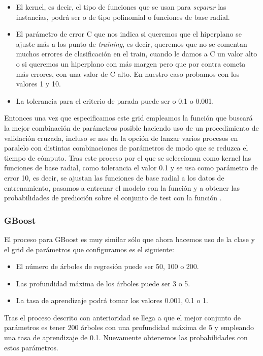 \begin{itemize}
\item El kernel, es decir, el tipo de funciones que se usan para \textit{separar} las instancias, podrá ser o de tipo polinomial o funciones de base radial.
\item El parámetro de error C que nos indica si queremos que el hiperplano se ajuste más a los punto de \textit{training}, es decir, queremos que no se comentan muchos errores de clasificación en el train, cuando le damos a C un valor alto o si queremos un hiperplano con más margen pero que por contra cometa más errores, con una valor de C alto. En nuestro caso probamos con los valores 1 y 10.
\item La tolerancia para el criterio de parada puede ser o 0.1 o 0.001.
\end{itemize}

Entonces una vez que especificamos este grid empleamos la función  que buscará la mejor combinación de parámetros posible haciendo uso de un procedimiento de validación cruzada, incluso se nos da la opción de lanzar varios procesos en paralelo con distintas combinaciones de parámetros de modo que se reduzca el tiempo de cómputo. Tras este proceso por el que se seleccionan como kernel las funciones de base radial, como tolerancia el valor 0.1 y se usa como parámetro de error 10, es decir, se ajustan las funciones de base radial a los datos de entrenamiento, pasamos a entrenar el modelo con la función  y a obtener las probabilidades de predicción sobre el conjunto de test con la función .

\subsubsection{GBoost}

El proceso para GBoost es muy similar sólo que ahora hacemos uso de la clase  y el grid de parámetros que configuramos es el siguiente:

\begin{itemize}
\item El número de árboles de regresión puede ser 50, 100 o 200.
\item Las profundidad máxima de los árboles puede ser 3 o 5.
\item La tasa de aprendizaje podrá tomar los valores 0.001, 0.1 o 1.
\end{itemize}

Tras el proceso descrito con anterioridad se llega a que el mejor conjunto de parámetros es tener 200 árboles con una profundidad máxima de 5 y empleando una tasa de aprendizaje de 0.1. Nuevamente obtenemos las probabilidades con estos parámetros.

